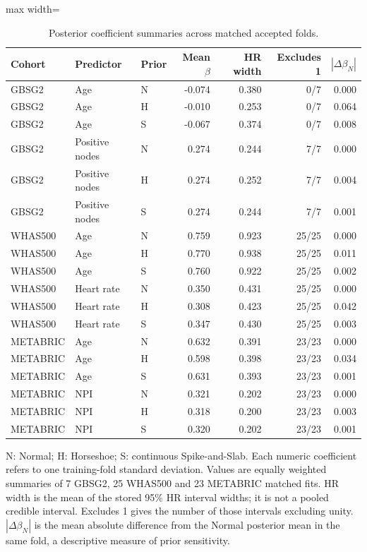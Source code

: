 \begin{table}[htbp]
\centering
\begingroup\singlespacing\footnotesize
\setlength{\tabcolsep}{3pt}
\caption{Posterior coefficient summaries across matched accepted folds.}\label{tab:exam-posterior-summary}
\begin{adjustbox}{max width=\textwidth}
\begin{tabular}{@{}lllrrrr@{}}
\toprule Cohort & Predictor & Prior & Mean $\beta$ & HR width & Excludes 1 & $|\Delta\beta_N|$\\\midrule
GBSG2 & Age & N & -0.074 & 0.380 & 0/7 & 0.000\\
GBSG2 & Age & H & -0.010 & 0.253 & 0/7 & 0.064\\
GBSG2 & Age & S & -0.067 & 0.374 & 0/7 & 0.008\\
GBSG2 & Positive nodes & N & 0.274 & 0.244 & 7/7 & 0.000\\
GBSG2 & Positive nodes & H & 0.274 & 0.252 & 7/7 & 0.004\\
GBSG2 & Positive nodes & S & 0.274 & 0.244 & 7/7 & 0.001\\
WHAS500 & Age & N & 0.759 & 0.923 & 25/25 & 0.000\\
WHAS500 & Age & H & 0.770 & 0.938 & 25/25 & 0.011\\
WHAS500 & Age & S & 0.760 & 0.922 & 25/25 & 0.002\\
WHAS500 & Heart rate & N & 0.350 & 0.431 & 25/25 & 0.000\\
WHAS500 & Heart rate & H & 0.308 & 0.423 & 25/25 & 0.042\\
WHAS500 & Heart rate & S & 0.347 & 0.430 & 25/25 & 0.003\\
METABRIC & Age & N & 0.632 & 0.391 & 23/23 & 0.000\\
METABRIC & Age & H & 0.598 & 0.398 & 23/23 & 0.034\\
METABRIC & Age & S & 0.631 & 0.393 & 23/23 & 0.001\\
METABRIC & NPI & N & 0.321 & 0.202 & 23/23 & 0.000\\
METABRIC & NPI & H & 0.318 & 0.200 & 23/23 & 0.003\\
METABRIC & NPI & S & 0.320 & 0.202 & 23/23 & 0.001\\
\bottomrule
\end{tabular}
\end{adjustbox}
\par\smallskip
\begin{minipage}{\textwidth}
N: Normal; H: Horseshoe; S: continuous Spike-and-Slab. Each numeric coefficient refers to one training-fold standard deviation. Values are equally weighted summaries of 7 GBSG2, 25 WHAS500 and 23 METABRIC matched fits. HR width is the mean of the stored 95\% HR interval widths; it is not a pooled credible interval. Excludes 1 gives the number of those intervals excluding unity. $|\Delta\beta_N|$ is the mean absolute difference from the Normal posterior mean in the same fold, a descriptive measure of prior sensitivity.
\end{minipage}
\endgroup
\end{table}
